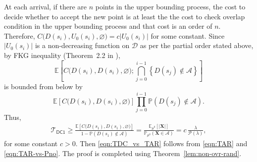 \documentclass[11pt]{article}
\newcommand{\pp}{\mathbb{P}}
\newcommand{\ee}{\mathbb{E}}
\newcommand{\lt}{\left}
\newcommand{\rt}{\right}
\newcommand{\pno}{\mathcal{P}(\lambda)}
\newcommand{\state}{\mathbf{X}}
\begin{document}
\begin{appendices}
At each arrival,  if there  are $n$ points in  the upper bounding process, the cost to decide whether to accept the new point is at least the the cost to check overlap condition in the upper bounding process and that cost is an order of $n$. Therefore, $C\Big(D(s_i), U_0(s_i), \varnothing\Big) = c |U_0(s_i)|$ for some constant. Since $|U_0(s_i)|$ is a non-decreasing function on $\mathscr{D}$ as per the partial order stated above, by FKG inequality (Theorem~2.2 in \cite{MR96}), 
\[
 \ee\lt[ C\Big(D(s_i), D(s_i), \varnothing\Big) ; \bigcap_{j=0}^{i-1} \lt\{D(s_j) \notin \mathscr{A}\rt\} \rt]
\]
is bounded from below by
\[
 \ee\lt[ C\Big(D(s_i), D(s_i), \varnothing\Big)\rt] \prod_{j=0}^{i-1} \pp\lt( D(s_j) \notin \mathscr{A} \rt).
\]
Thus,
\begin{align*}
 \mathcal{T}_{\mathsf{DC1}} \geq  \frac{\ee\lt[ C\Big(D(s_1), D(s_1), \varnothing\Big)\rt]}{1 - \pp\lt( D(s_1) \notin \mathscr{A} \rt)} = \frac{\ee_{\mu^0}\lt[ |\state| \rt]}{\pp_{\mu^0} \lt( \state \in \mathscr{A} \rt)} = c\,\frac{\lambda}{\pno},
\end{align*}
for some constant $c > 0$. Then \eqref{eqn:TDC_vs_TAR} follows from \eqref{eqn:TAR} and \eqref{eqn:TAR-vs-Pno}. The proof is completed using Theorem~\ref{lem:non-ovr-rand}.


\end{appendices}



\end{document}
